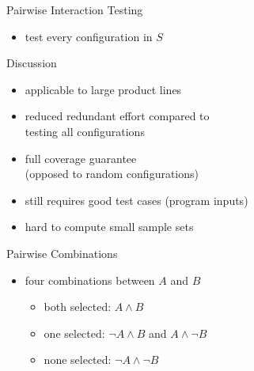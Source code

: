 \begin{frame}{\myframetitle{} }
\begin{mycolumns}
\begin{definition}{Pairwise Interaction Testing}
\begin{itemize}
				\item test every configuration in $S$
			\end{itemize}
		\end{definition}
	\mynextcolumn
		\pause
		\begin{note}{Discussion}
			\begin{itemize}
				\setlength\itemsep{.4em}
				\item applicable to large product lines
				\item reduced redundant effort compared to\\testing all configurations
				\item full coverage guarantee\\(opposed to random configurations)
				\vspace*{1ex}
				\item still requires good test cases (program inputs)
				\item hard to compute small sample sets
			\end{itemize}
		\end{note}
		\pause
		\begin{definition}{Pairwise Combinations}
			\begin{itemize}
				\setlength\itemsep{.5em}
				\item four combinations between $A$ and $B$
				\begin{itemize}
					\item both selected: $A \wedge B$
					\item one selected: $\neg A \wedge B$ and $A \wedge \neg B$
					\item none selected: $\neg A \wedge \neg B$
				\end{itemize}
				\end{itemize}
		\end{definition}
	\end{mycolumns}
\end{frame}

